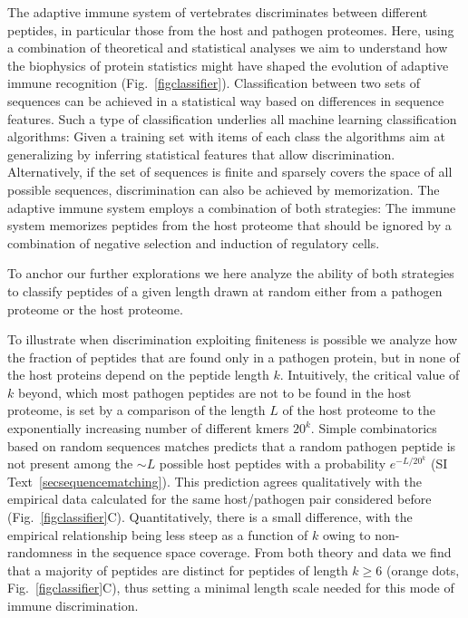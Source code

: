 \documentclass[superscriptaddress,twocolumn,pre]{revtex4}
\newcommand{\<}{\langle}
\renewcommand{\>}{\rangle}
\begin{document}
The adaptive immune system of vertebrates discriminates between different peptides, in particular those from the host and pathogen proteomes. Here, using a combination of theoretical and statistical analyses we aim to understand how the biophysics of protein statistics might have shaped the evolution of adaptive immune recognition (Fig.~\ref{figclassifier}). Classification between two sets of sequences can be achieved in a statistical way based on differences in sequence features. Such a type of classification underlies all machine learning classification algorithms: Given a training set with items of each class the algorithms aim at generalizing by inferring statistical features that allow discrimination. Alternatively, if the set of sequences is finite and sparsely covers the space of all possible sequences, discrimination can also be achieved by memorization. The adaptive immune system employs a combination of both strategies: The immune system memorizes peptides from the host proteome that should be ignored by a combination of negative selection and induction of regulatory cells. 

To anchor our further explorations we here analyze the ability of both strategies to classify peptides of a given length drawn at random either from a pathogen proteome or the host proteome.

To illustrate when discrimination exploiting finiteness is possible we analyze how the fraction of peptides that are found only in a pathogen protein, but in none of the host proteins depend on the peptide length $k$. Intuitively, the critical value of $k$ beyond, which most pathogen peptides are not to be found in the host proteome, is set by a comparison of the length $L$ of the host proteome to the exponentially increasing number of different kmers $20^k$. Simple combinatorics based on random sequences matches predicts that a random pathogen peptide is not present among the $\sim L$ possible host peptides with a probability $e^{-L/20^k}$ (SI Text~\ref{secsequencematching}). This prediction agrees qualitatively with the empirical data calculated for the same host/pathogen pair considered before (Fig.~\ref{figclassifier}C). Quantitatively, there is a small difference, with the empirical relationship being less steep as a function of $k$ owing to non-randomness in the sequence space coverage. From both theory and data we find that a majority of peptides are distinct for peptides of length $k\geq6$ (orange dots, Fig.~\ref{figclassifier}C), thus setting a minimal length scale needed for this mode of immune discrimination.  
\end{document}
